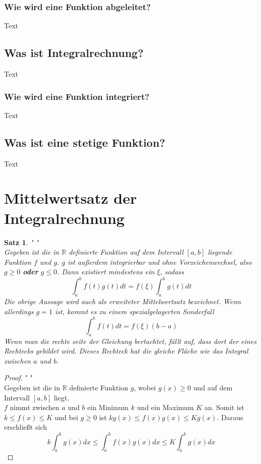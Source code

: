 \documentclass[fontsize=12pt,paper=a4,DIV12,cleardoublepage=empty, 
liststotoc,idxtotoc,bibtotoc]{article}
\newcommand{\RR}{\mathbb{R}}
\theoremstyle{plain}
\newtheorem{satz}{Satz}[subsection]
\theoremstyle{definition}
\begin{document}
	
	\subsubsection{Wie wird eine Funktion abgeleitet?}
		Text
	
	
	\subsection{Was ist Integralrechnung?}
		Text


	\subsubsection{Wie wird eine Funktion integriert?}
		Text \cite{KW}
		
	
	\subsection{Was ist eine stetige Funktion?}
		Text	
	
	
	\section{Mittelwertsatz der Integralrechnung}
	\begin{satz}" "\\
		Gegeben ist die in $\RR$ definierte Funktion auf dem Intervall $[a, b]$ liegende Funktion $f$ und $g$. $g$ ist außerdem integrierbar und ohne Vorzeichenwechsel, also $g \geq 0$ \textbf{oder} $g \leq 0$. Dann existiert mindestens ein $\xi$, sodass
		\begin{equation*}
			\int_{a}^{b}f(t)g(t)dt=f(\xi)\int_{a}^{b}g(t)dt			
		\end{equation*}
		Die obrige Aussage wird auch als erweiteter Mittelwertsatz bezeichnet. Wenn allerdings $g=1$ ist, kommt es zu einem spezialgelagerten Sonderfall\\
		\begin{equation*}
			\int_{a}^{b}f(t)dt=f(\xi)(b-a)
		\end{equation*}
		Wenn man die rechte seite der Gleichung bertachtet, fällt auf, dass dort der eines Rechtecks gebildet wird. Dieses Rechteck hat die gleiche Fläche wie das Integral zwischen $a$ und $b$.		
		
	\end{satz}
	
	\begin{proof}" "\\
		Gegeben ist die in $\RR$ definierte Funktion $g$, wobei $g(x)\geq0$ und auf dem Intervall $[a, b]$ liegt.\\
		$f$ nimmt zwischen $a$ und $b$ ein Minimum $k$ und ein Maximum $K$ an. Somit ist $k \leq f(x) \leq K$ und bei $g\geq0$ ist $kg(x)\leq f(x)g(x)\leq Kg(x)$. Daraus erschließt sich
		\begin{equation*}
			k \int_{a}^{b}g(x)dx \leq \int_{a}^{b}f(x)g(x)dx\leq K\int_{a}^{b}g(x)dx
		\end{equation*}
	\end{proof}
	
\end{document}
